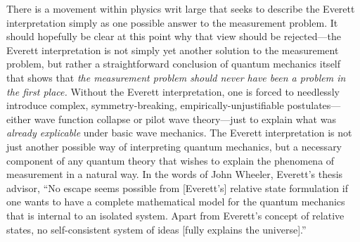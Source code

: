 \documentclass[
    12pt,
    letterpaper,
    aps,
    prd,
    longbibliography,
    twocolumn,
    nofootinbib,
    raggedbottom,
    amsmath,
    amssymb,
    amsfonts,
]{revtex4-1}
\begin{document}
There is a movement within physics writ large that seeks to describe the Everett interpretation simply as one possible answer to the measurement problem. It should hopefully be clear at this point why that view should be rejected---the Everett interpretation is not simply yet another solution to the measurement problem, but rather a straightforward conclusion of quantum mechanics itself that shows that \textit{the measurement problem should never have been a problem in the first place.} Without the Everett interpretation, one is forced to needlessly introduce complex, symmetry-breaking, empirically-unjustifiable postulates---either wave function collapse or pilot wave theory---just to explain what was \textit{already explicable} under basic wave mechanics. The Everett interpretation is not just another possible way of interpreting quantum mechanics, but a necessary component of any quantum theory that wishes to explain the phenomena of measurement in a natural way. In the words of John Wheeler, Everett's thesis advisor, ``No escape seems possible from [Everett's] relative state formulation if one wants to have a complete mathematical model for the quantum mechanics that is internal to an isolated system. Apart from Everett's concept of relative states, no self-consistent system of ideas [fully explains the universe].''\cite{wheeler}


\end{document}

